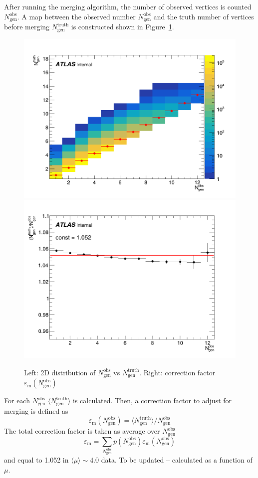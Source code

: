 After running the merging algorithm, the number of observed vertices is counted $N_\text{gen}^\text{obs}$. A map between the observed number $N_\text{gen}^\text{obs}$ and the truth number of vertices before merging $N_\text{gen}^\text{truth}$ is constructed shown in  Figure~\ref{fig:nobs_vs_ngen}.
  \begin{figure}[h]
      \centering
      \includegraphics[width=0.45\linewidth]{images/nobs_vs_ngen.png}
      \includegraphics[width=0.45\linewidth]{images/ratio_nobs_ngen.png}
      \caption{Left: 2D distribution of $N_\text{gen}^\text{obs}$ vs $N_\text{gen}^\text{truth}$. Right: correction factor $\varepsilon_\text{m} (N_\text{gen}^\text{obs})$}
      \label{fig:nobs_vs_ngen}
  \end{figure}
  
  For each $N_\text{gen}^\text{obs}$ $\langle N_\text{gen}^\text{truth}\rangle$ is calculated. Then, a correction factor to adjust for merging is defined as 
  \begin{equation}
      \varepsilon_\text{m}(N_\text{gen}^\text{obs}) =\langle N_\text{gen}^\text{truth}\rangle/ N_\text{gen}^\text{obs}
  \end{equation}
  The total correction factor is taken as average over $N_\text{gen}^\text{obs}$
  \begin{equation}
      \varepsilon_\text{m} = \sum_{N_\text{gen}^\text{obs}} p(N_\text{gen}^\text{obs})\varepsilon_\text{m}(N_\text{gen}^\text{obs})
  \end{equation}
and equal to 1.052 in $\langle \mu \rangle \sim 4.0$ data. {\blue To be updated -- calculated as a function of $\mu$.} 

